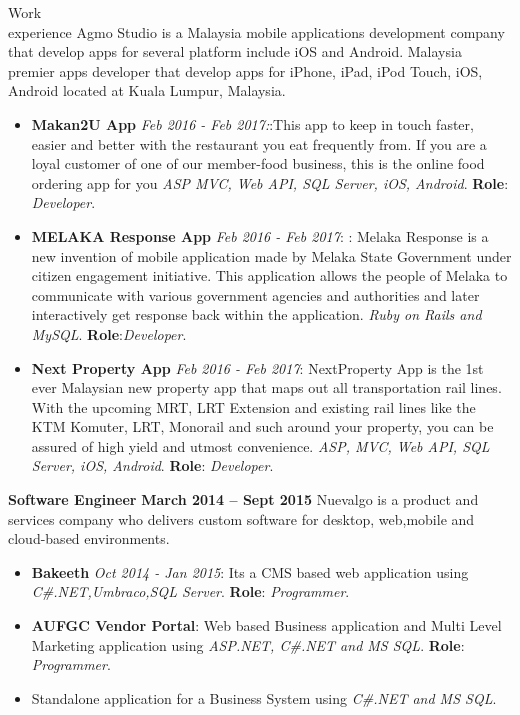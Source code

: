 \documentclass{resume}
\begin{document}
\begin{category}{Work \\experience}
  \citemnobullet Agmo Studio is a Malaysia mobile applications development company that develop apps for several platform include iOS and Android. Malaysia premier apps developer that develop apps for iPhone, iPad, iPod Touch, iOS, Android located at Kuala Lumpur, Malaysia.
  \begin{itemize}
  \item \textbf{Makan2U App} {\em Feb 2016 - Feb 2017:}:This app to keep in touch faster, easier and better with the restaurant you eat frequently from. If you are a loyal customer of one of our member-food business, this is the online food ordering app for you {\em ASP MVC, Web API, SQL Server, iOS, Android}. \textbf{Role}: {\em Developer}. 
  \item \textbf{MELAKA Response App} {\em Feb 2016 - Feb 2017}: : Melaka Response is a new invention of mobile application made by Melaka State Government under citizen engagement initiative. This application allows the people of Melaka to communicate with various government agencies and authorities and later interactively get response back within
  the application.  {\em Ruby on Rails and MySQL}. \textbf{Role}:{\em Developer}.

  \item \textbf{Next Property App} {\em Feb 2016 - Feb 2017}: NextProperty App is the 1st ever Malaysian new property app that maps out all transportation rail lines. With the upcoming MRT, LRT Extension and existing rail lines like the KTM Komuter, LRT, Monorail and such around your property, you can be assured of high yield and utmost convenience. {\em ASP, MVC, Web API, SQL Server, iOS, Android}. \textbf{Role}: {\em Developer}.
  \end{itemize}
  \citemnobullet \textbf{Software Engineer} \hfill \textbf{March 2014 – Sept 2015}
  \citemnobullet Nuevalgo is a product and services company who delivers custom software for desktop, web,mobile and cloud-based environments.
  \begin{itemize} 
  \item \textbf{Bakeeth} {\em Oct 2014 - Jan 2015}: Its a CMS based web application using {\em C\#.NET,Umbraco,SQL Server}. \textbf{Role}: {\em Programmer}.
  \item \textbf{AUFGC Vendor Portal}: Web based Business application and Multi Level Marketing
    application using {\em ASP.NET, C\#.NET and MS SQL}. \textbf{Role}: {\em Programmer}.
  \item Standalone application for a Business System using {\em C\#.NET and MS SQL}.
  \end{itemize}
\end{category}
\end{document}
